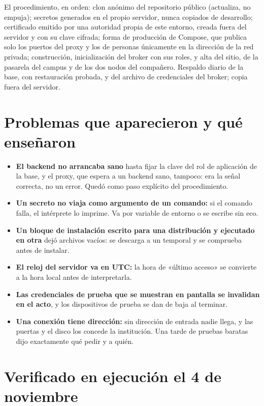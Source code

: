 El procedimiento, en orden: clon anónimo del repositorio público (actualiza, no empuja); secretos generados en el propio servidor, nunca
copiados de desarrollo; certificado emitido por una autoridad propia de este entorno, creada fuera del servidor y con su clave cifrada; forma de
producción de Compose, que publica solo los puertos del proxy y los de personas únicamente en la dirección de la red privada; construcción,
inicialización del broker con sus roles, y alta del sitio, de la pasarela del campus y de los dos nodos del compañero. Respaldo diario de la base, con restauración probada, y del archivo de credenciales del broker; copia fuera del servidor.

\section{Problemas que aparecieron y qué enseñaron}

\begin{itemize}
\item \textbf{El backend no arrancaba sano} hasta fijar la clave del rol de aplicación de la base, y el proxy, que espera a un backend sano,
  tampoco: era la señal correcta, no un error. Quedó como paso explícito del procedimiento.
\item \textbf{Un secreto no viaja como argumento de un comando:} si el comando falla, el intérprete lo imprime. Va por variable de entorno
  o se escribe sin eco.
\item \textbf{Un bloque de instalación escrito para una distribución y ejecutado en otra} dejó archivos vacíos: se descarga a un temporal
  y se comprueba antes de instalar.
\item \textbf{El reloj del servidor va en UTC:} la hora de «último acceso» se convierte a la hora local antes de interpretarla.
\item \textbf{Las credenciales de prueba que se muestran en pantalla se invalidan en el acto}, y los dispositivos de prueba se dan de baja
  al terminar.
\item \textbf{Una conexión tiene dirección:} sin dirección de entrada nadie llega, y las puertas y el disco los concede la institución.
  Una tarde de pruebas baratas dijo exactamente qué pedir y a quién.
\end{itemize}

\section{Verificado en ejecución el 4 de noviembre}

